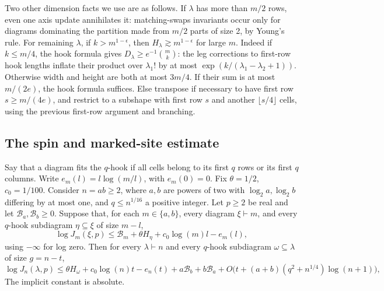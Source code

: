 Two other dimension facts we use are as follows. If \(\lambda\) has more than \(m/2\) rows, even one axis update annihilates it: matching-swaps invariants occur only for diagrams dominating the partition made from \(m/2\) parts of size 2, by Young's rule. For remaining \(\lambda\), if \(k>m^{1-\epsilon}\), then \(H_\lambda\gtrsim m^{1-\epsilon}\) for large \(m\). Indeed if \(k\le m/4\), the hook formula gives \(D_\lambda\ge e^{-1}\binom mk\): the leg corrections to first-row hook lengths inflate their product over \(\lambda_1!\) by at most \(\exp(k/(\lambda_1-\lambda_2+1))\). Otherwise width and height are both at most \(3m/4\). If their sum is at most \(m/(2e)\), the hook formula suffices. Else transpose if necessary to have first row \(s\ge m/(4e)\), and restrict to a subshape with first row \(s\) and another \(\lfloor s/4\rfloor\) cells, using the previous first-row argument and branching.

\subsection{The spin and marked-site estimate}


\begin{proposition}
\label{ten:inverse:main}
Say that a diagram fits the \(q\)-hook if all cells belong to its first \(q\) rows or its first \(q\) columns. Write \(e_m(l)=l\log(m/l)\), with \(e_m(0)=0\). Fix \(\theta=1/2\), \(c_0=1/100\). Consider \(n=ab\ge2\), where \(a,b\) are powers of two with \(\log_2 a,\log_2 b\) differing by at most one, and \(q\le n^{1/16}\) a positive integer. Let \(p\ge2\) be real and let \(\mathcal B_a,\mathcal B_b\ge0\). Suppose that, for each \(m\in\{a,b\}\), every diagram \(\xi\vdash m\), and every \(q\)-hook subdiagram \(\eta\subseteq\xi\) of size \(m-l\),
\begin{equation}
 \log J_m(\xi,p)\le \mathcal B_m+\theta H_\eta+c_0\log(m)l-e_m(l),
 \label{ten:inverse:eq:2}
\end{equation}
using \(-\infty\) for log zero. Then for every \(\lambda\vdash n\) and every \(q\)-hook subdiagram \(\omega\subseteq\lambda\) of size \(g=n-t\),
\begin{equation}
 \log J_n(\lambda,p)
 \le \theta H_\omega+c_0\log(n)t-e_n(t)+
 a\mathcal B_b+b\mathcal B_a+O\big(t+(a+b)(q^2+n^{1/4})\log(n+1)\big),
 \label{ten:inverse:eq:3}
\end{equation}
The implicit constant is absolute.

\end{proposition}

